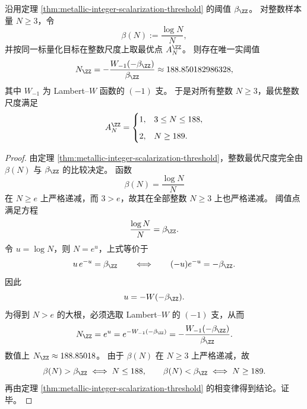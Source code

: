 \begin{corollary}\label{cor:metallic-sample-penalty-integer-threshold-lambertw}
沿用定理 \ref{thm:metallic-integer-scalarization-threshold} 的阈值 \(\beta_{\ZZ}\)。
对整数样本量 \(N\ge 3\)，令
\[
\beta(N):=\frac{\log N}{N},
\]
并按同一标量化目标在整数尺度上取最优点 \(A_N^{\ZZ}\)。
则存在唯一实阈值
\[
N_{\ZZ}
=
-\frac{W_{-1}(-\beta_{\ZZ})}{\beta_{\ZZ}}
\approx 188.850182986328,
\]
其中 \(W_{-1}\) 为 Lambert--\(W\) 函数的 \((-1)\) 支。
于是对所有整数 \(N\ge 3\)，最优整数尺度满足
\[
A_N^{\ZZ}
=
\begin{cases}
1,& 3\le N\le 188,\\[2mm]
2,& N\ge 189.
\end{cases}
\]
\end{corollary}
\begin{proof}
由定理 \ref{thm:metallic-integer-scalarization-threshold}，整数最优尺度完全由 \(\beta(N)\) 与 \(\beta_{\ZZ}\) 的比较决定。
函数
\[
\beta(N)=\frac{\log N}{N}
\]
在 \(N\ge e\) 上严格递减，而 \(3>e\)，故其在全部整数 \(N\ge 3\) 上也严格递减。
阈值点满足方程
\[
\frac{\log N}{N}=\beta_{\ZZ}.
\]
令 \(u=\log N\)，则 \(N=e^u\)，上式等价于
\[
u\,e^{-u}=\beta_{\ZZ}
\qquad\Longleftrightarrow\qquad
(-u)e^{-u}=-\beta_{\ZZ}.
\]
因此
\[
u=-W(-\beta_{\ZZ}).
\]
为得到 \(N>e\) 的大根，必须选取 Lambert--\(W\) 的 \((-1)\) 支，从而
\[
N_{\ZZ}=e^u
=
e^{-W_{-1}(-\beta_{\ZZ})}
=
-\frac{W_{-1}(-\beta_{\ZZ})}{\beta_{\ZZ}}.
\]
数值上 \(N_{\ZZ}\approx 188.85018\)。
由于 \(\beta(N)\) 在 \(N\ge 3\) 上严格递减，故
\[
\beta(N)>\beta_{\ZZ}\iff N\le 188,
\qquad
\beta(N)<\beta_{\ZZ}\iff N\ge 189.
\]
再由定理 \ref{thm:metallic-integer-scalarization-threshold} 的相变律得到结论。证毕。
\end{proof}

\endinput
